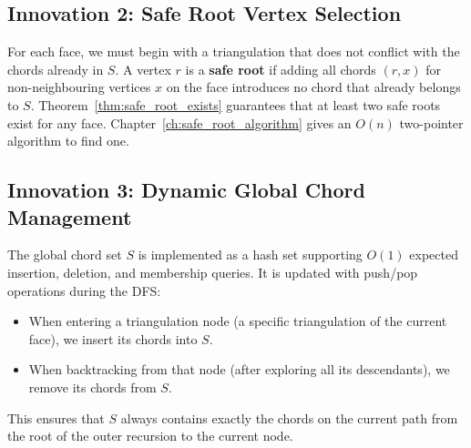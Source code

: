 \subsection{Innovation 2: Safe Root Vertex Selection}
\label{sec:safe_root_innovation}

For each face, we must begin with a triangulation that does not conflict with the chords already in \(S\). 
A vertex \(r\) is a \textbf{safe root} if adding all chords \((r, x)\) for non-neighbouring vertices \(x\) on the face introduces no chord that already belongs to \(S\). 
Theorem~\ref{thm:safe_root_exists} guarantees that at least two safe roots exist for any face. 
Chapter~\ref{ch:safe_root_algorithm} gives an \(O(n)\) two-pointer algorithm to find one.

\subsection{Innovation 3: Dynamic Global Chord Management}
\label{sec:global_chord_innovation}

The global chord set \(S\) is implemented as a hash set supporting \(O(1)\) expected insertion, deletion, and membership queries. 
It is updated with push/pop operations during the DFS:

\begin{itemize}
    \item When entering a triangulation node (a specific triangulation of the current face), we insert its chords into \(S\).
    \item When backtracking from that node (after exploring all its descendants), we remove its chords from \(S\).
\end{itemize}

This ensures that \(S\) always contains exactly the chords on the current path from the root of the outer recursion to the current node.


